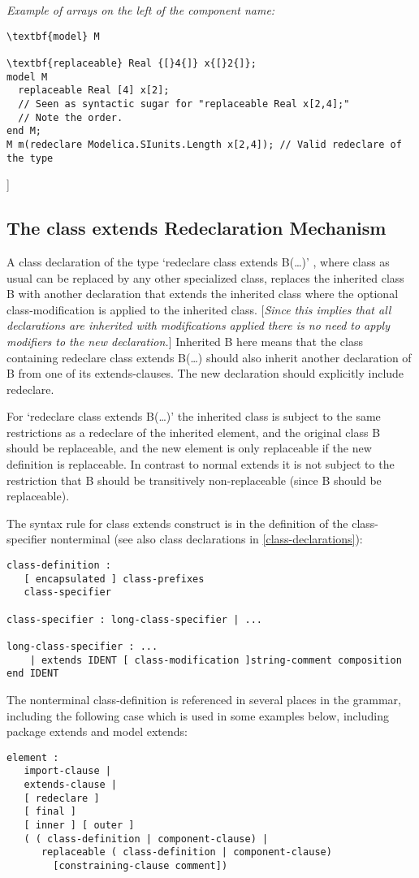 \emph{Example of arrays on the left of the component name:}
\begin{lstlisting}[language=modelica]
\textbf{model} M

\textbf{replaceable} Real {[}4{]} x{[}2{]};
model M
  replaceable Real [4] x[2];
  // Seen as syntactic sugar for "replaceable Real x[2,4];"
  // Note the order.
end M;
M m(redeclare Modelica.SIunits.Length x[2,4]); // Valid redeclare of the type
\end{lstlisting}

{]}

\subsection{The class extends Redeclaration Mechanism}

A class declaration of the type `redeclare class extends B(\ldots{})' ,
where class as usual can be replaced by any other specialized class,
replaces the inherited class B with another declaration that extends the
inherited class where the optional class-modification is applied to the
inherited class. {[}\emph{Since this implies that all declarations are
inherited with modifications applied there is no need to apply modifiers
to the new declaration.}{]} Inherited B here means that the class
containing redeclare class extends B(\ldots{}) should also inherit
another declaration of B from one of its extends-clauses. The new
declaration should explicitly include redeclare.

For `redeclare class extends B(\ldots{})' the inherited class is subject
to the same restrictions as a redeclare of the inherited element, and
the original class B should be replaceable, and the new element is only
replaceable if the new definition is replaceable. In contrast to normal
extends it is not subject to the restriction that B should be
transitively non-replaceable (since B should be replaceable).

The syntax rule for class extends construct is in the definition of the
class-specifier nonterminal (see also class declarations in \ref{class-declarations}):

\begin{lstlisting}[language=grammar]
class-definition :
   [ encapsulated ] class-prefixes
   class-specifier

class-specifier : long-class-specifier | ...

long-class-specifier : ...
    | extends IDENT [ class-modification ]string-comment composition end IDENT
\end{lstlisting}
The nonterminal class-definition is referenced in several places in the
grammar, including the following case which is used in some examples
below, including package extends and model extends:
\begin{lstlisting}[language=grammar]
element :
   import-clause |
   extends-clause |
   [ redeclare ]
   [ final ]
   [ inner ] [ outer ]
   ( ( class-definition | component-clause) |
      replaceable ( class-definition | component-clause)
        [constraining-clause comment])
\end{lstlisting}

